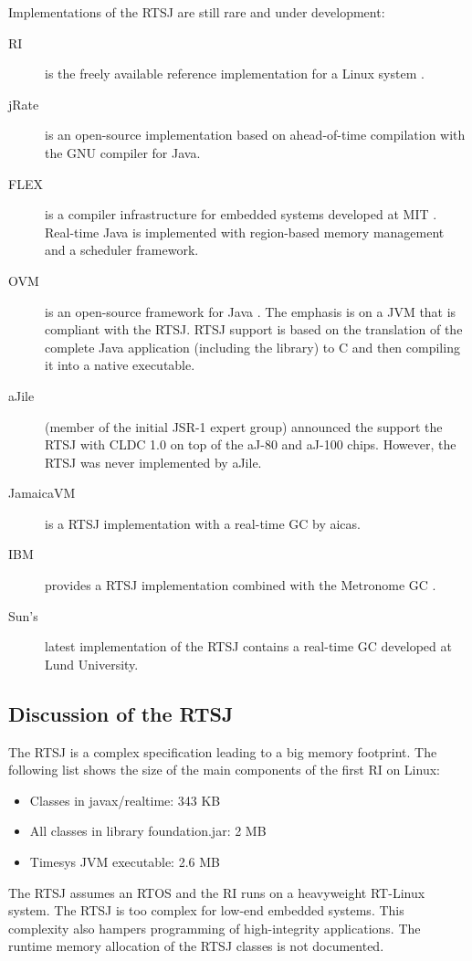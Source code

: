 Implementations of the RTSJ are still rare and under development:
%
\begin{description}
    \item[RI]
is the freely available reference implementation for a Linux system
\cite{rtsj-ri}.

    \item[jRate]
is an open-source implementation \cite{701668} based on
ahead-of-time compilation with the GNU compiler for Java.

    \item[FLEX]
is a compiler infrastructure for embedded systems developed at MIT
\cite{flex}. Real-time Java is implemented with region-based memory
management and a scheduler framework.

    \item[OVM]
is an open-source framework for Java \cite{ovmir2003}. The emphasis
is on a JVM that is compliant with the RTSJ. RTSJ support is based
on the translation of the complete Java application (including the
library) to C and then compiling it into a native executable.

    \item[aJile] (member of the initial JSR-1 expert group) announced the support the RTSJ with CLDC 1.0 on top of
    the aJ-80 and aJ-100 chips. However, the RTSJ was never
    implemented by aJile.

    \item[JamaicaVM] is a RTSJ implementation with a real-time GC by
    aicas.

    \item[IBM] provides a RTSJ implementation combined with the
    Metronome GC \cite{gc:bacon03}.

    \item[Sun's] latest implementation of the RTSJ contains a
    real-time GC developed at Lund University.
\end{description}


\subsection{Discussion of the RTSJ}

The RTSJ is a complex specification leading to a big memory
footprint. The following list shows the size of the main components
of the first RI on Linux:
%
\begin{itemize}
    \item Classes in javax/realtime: 343 KB
    \item All classes in library foundation.jar: 2 MB
    \item Timesys JVM executable: 2.6 MB
\end{itemize}
%
The RTSJ assumes an RTOS and the RI runs on a heavyweight RT-Linux
system. The RTSJ is too complex for low-end embedded systems. This
complexity also hampers programming of high-integrity applications.
The runtime memory allocation of the RTSJ classes is not documented.


